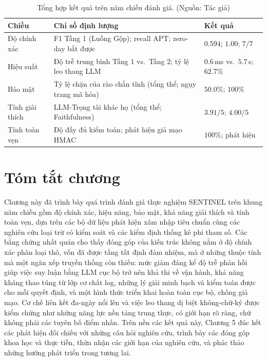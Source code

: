 \begin{table}[!htbp]
    \centering
    \caption{Tổng hợp kết quả trên năm chiều đánh giá. (Nguồn: Tác giả)}
    \label{tab:5d_summary}
    \begin{tabular}{|>{\raggedright\arraybackslash}p{}|>{\raggedright\arraybackslash}p{}|>{\raggedright\arraybackslash}p{}|}
        \hline
        \textbf{Chiều} & \textbf{Chỉ số định lượng} & \textbf{Kết quả} \\
        \hline
        Độ chính xác & F1 Tầng 1 (Luồng Gộp); recall APT; zero-day bắt được & $0.594$; $1.00$; $7/7$ \\
        \hline
        Hiệu suất & Độ trễ trung bình Tầng 1 vs.\ Tầng 2; tỷ lệ leo thang LLM & $0.6$\,ms vs.\ $5.7$\,s; $62.7\%$ \\
        \hline
        Bảo mật & Tỷ lệ chặn của rào chắn tĩnh (tổng thể; ngụy trang mã hóa) & $50.0\%$; $100\%$ \\
        \hline
        Tính giải thích & LLM-Trọng tài khác họ (tổng thể; Faithfulness) & $3.91/5$; $4.00/5$ \\
        \hline
        Tính toàn vẹn & Độ đầy đủ kiểm toán; phát hiện giả mạo HMAC & $100\%$; phát hiện \\
        \hline
    \end{tabular}
\end{table}

\section{Tóm tắt chương}
Chương này đã trình bày quá trình đánh giá thực nghiệm SENTINEL trên khung năm chiều gồm độ chính xác, hiệu năng, bảo mật, khả năng giải thích và tính toàn vẹn, dựa trên các bộ dữ liệu phát hiện xâm nhập tiêu chuẩn cùng các nghiên cứu loại trừ có kiểm soát và các kiểm định thống kê phi tham số. Các bằng chứng nhất quán cho thấy đóng góp của kiến trúc không nằm ở độ chính xác phân loại thô, vốn đã được tầng tất định đảm nhiệm, mà ở những thuộc tính mà một ngăn xếp truyền thống còn thiếu: mức giảm đáng kể độ trễ phản hồi giúp việc suy luận bằng LLM cục bộ trở nên khả thi về vận hành, khả năng kháng thao túng từ lớp cơ chất log, những lý giải minh bạch và kiểm toán được cho mỗi quyết định, và một hình thức triển khai hoàn toàn cục bộ, chống giả mạo. Cơ chế liên kết đa-ngày nổi lên và việc leo thang dị biệt không-chữ-ký được kiểm chứng như những năng lực nền tảng trung thực, có giới hạn rõ ràng, chứ không phải các tuyên bố điểm nhấn. Trên nền các kết quả này, Chương 5 đúc kết các phát hiện đối chiếu với những câu hỏi nghiên cứu, trình bày các đóng góp khoa học và thực tiễn, thừa nhận các giới hạn của nghiên cứu, và phác thảo những hướng phát triển trong tương lai.
